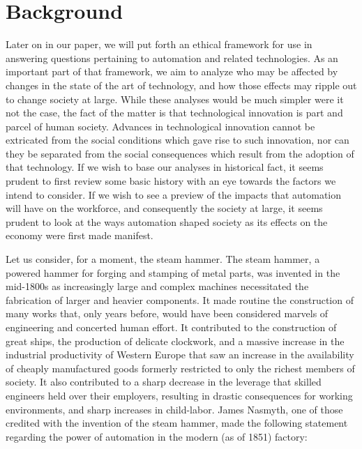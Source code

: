 \section{Background}
\label{sec:-background}

Later on in our paper, we will put forth an ethical framework for use 
in answering questions pertaining to automation and related technologies. 
As an important part of that framework, we aim to analyze who may be 
affected by changes in the state of the art of technology, and how 
those effects may ripple out to change society at large.  While these 
analyses would be much simpler were it not the case, the fact of the 
matter is that technological innovation is part and parcel of human 
society.  Advances in technological innovation cannot be extricated from 
the social conditions which gave rise to such innovation, nor can 
they be separated from the social consequences which result from 
the adoption of that technology.  If we wish to base 
our analyses in historical fact, it seems prudent to first review some 
basic history with an eye towards the factors we intend to consider.  
If we wish to see a preview of the impacts that automation will have 
on the workforce, and consequently the society at large, it seems 
prudent to look at the ways automation shaped society as its effects 
on the economy were first made manifest.

Let us consider, for a moment, the steam hammer. The steam hammer, a 
powered hammer for forging and 
stamping of metal parts, was invented in the mid-1800s as increasingly 
large and complex machines necessitated the fabrication of larger and 
heavier components.  It made routine the construction of many works 
that, only years before, would have been considered marvels of 
engineering and concerted human effort.  It contributed to the construction 
of great ships, the production of delicate clockwork, and a massive 
increase in the industrial productivity of Western Europe that saw an 
increase in the availability of cheaply manufactured goods formerly 
restricted to only the richest members of society.  It also 
contributed\cite{gaskell1833manufacturing} to a sharp decrease in the 
leverage that skilled engineers held over their employers, resulting in 
drastic consequences for working environments, and sharp increases in 
child-labor.  James Nasmyth, one of those credited with the invention 
of the steam hammer, made the following statement regarding the power 
of automation in the modern (as of 1851) factory:

